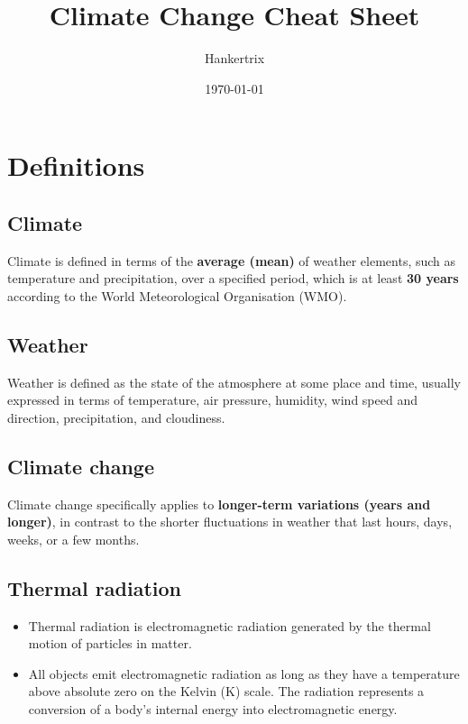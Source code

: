 \documentclass[11pt]{article}
\author{Hankertrix}
\date{\today}
\title{Climate Change Cheat Sheet}
\begin{document}
\maketitle
\setcounter{tocdepth}{2}
\tableofcontents \clearpage
\section{Definitions}
\label{sec:orgdc6be94}

\subsection{Climate}
\label{sec:org8c69d89}
Climate is defined in terms of the \textbf{average (mean)} of weather elements, such as temperature and precipitation, over a specified period, which is at least \textbf{30 years} according to the World Meteorological Organisation (WMO).

\subsection{Weather}
\label{sec:org040b74f}
Weather is defined as the state of the atmosphere at some place and time, usually expressed in terms of temperature, air pressure, humidity, wind speed and direction, precipitation, and cloudiness.

\subsection{Climate change}
\label{sec:orgdfd5564}
Climate change specifically applies to \textbf{longer-term variations (years and longer)}, in contrast to the shorter fluctuations in weather that last hours, days, weeks, or a few months.

\subsection{Thermal radiation}
\label{sec:orgfa73fc7}
\begin{itemize}
\item Thermal radiation is electromagnetic radiation generated by the thermal motion of particles in matter.
\item All objects emit electromagnetic radiation as long as they have a temperature above absolute zero on the Kelvin (K) scale. The radiation represents a conversion of a body's internal energy into electromagnetic energy.
\end{itemize}
\end{document}
